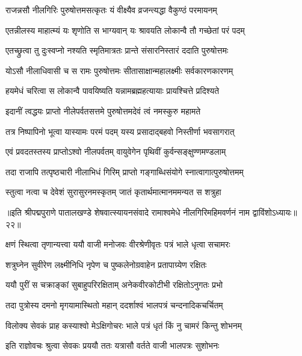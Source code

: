 \twolineshloka
{राजन्नसौ नीलगिरिः पुरुषोत्तमसत्कृतः}
{यं वीक्ष्यैव व्रजन्त्यद्धा वैकुण्ठं परमायनम्}%

\twolineshloka
{एतन्नीलस्य माहात्म्यं यः शृणोति स भाग्यवान्}
{यः श्रावयति लोकान्वै तौ गच्छेतां परं पदम्}%

\twolineshloka
{एतच्छ्रुत्वा तु दुःस्वप्नो नश्यति स्मृतिमात्रतः}
{प्रान्ते संसारनिस्तारं ददाति पुरुषोत्तमः}%

\twolineshloka
{योऽसौ नीलाधिवासी च स रामः पुरुषोत्तमः}
{सीतासाक्षान्महालक्ष्मीः सर्वकारणकारणम्}%

\twolineshloka
{हयमेधं चरित्वा स लोकान्वै पावयिष्यति}
{यन्नामब्रह्महत्यायाः प्रायश्चित्ते प्रदिश्यते}%

\twolineshloka
{इदानीं त्वद्धयः प्राप्तो नीलेपर्वतसत्तमे}
{पुरुषोत्तमदेवं त्वं नमस्कुरु महामते}%

\twolineshloka
{तत्र निष्पापिनो भूत्वा यास्यामः परमं पदम्}
{यस्य प्रसादाद्बहवो निस्तीर्णा भवसागरात्}%

\twolineshloka
{एवं प्रवदतस्तस्य प्राप्तोऽश्वो नीलपर्वतम्}
{वायुवेगेन पृथिवीं कुर्वन्सङ्क्षुण्णमण्डलाम्}%

\twolineshloka
{तदा राजापि तत्पृष्ठचारी नीलाभिधं गिरिम्}
{प्राप्तो गङ्गाब्धिसंयोगे स्नात्वागात्पुरुषोत्तमम्}%

\twolineshloka
{स्तुत्वा नत्वा च देवेशं सुरासुरनमस्कृतम्}
{जातं कृतार्थमात्मानममन्यत स शत्रुहा}%

॥इति श्रीपद्मपुराणे पातालखण्डे शेषवात्स्यायनसंवादे रामाश्वमेधे नीलगिरिमहिमवर्णनं नाम द्वाविंशोऽध्यायः॥२२॥



\twolineshloka
{क्षणं स्थित्वा तृणान्यत्त्वा ययौ वाजी मनोजवः}
{वीरश्रेणीवृतः पत्रं भाले धृत्वा सचामरः}%

\twolineshloka
{शत्रुघ्नेन सुवीरेण लक्ष्मीनिधि नृपेण च}
{पुष्कलेनोग्रवाहेन प्रतापाग्र्येण रक्षितः}%

\twolineshloka
{ययौ पुरीं स चक्राङ्कां सुबाहुपरिरक्षिताम्}
{अनेकवीरकोटीभी रक्षितोऽनुगतः प्रभो}%

\twolineshloka
{तदा पुत्रोस्य दमनो मृगयामास्थितो महान्}
{ददर्शाश्वं भालपत्रं चन्दनादिकचर्चितम्}%

\twolineshloka
{विलोक्य सेवकं प्राह कस्याश्वो मेऽक्षिगोचरः}
{भाले पत्रं धृतं किं नु चामरं किन्तु शोभनम्}%

\twolineshloka
{इति राज्ञोवचः श्रुत्वा सेवकः प्रययौ ततः}
{यत्रासौ वर्तते वाजी भालपत्रः सुशोभनः}%


